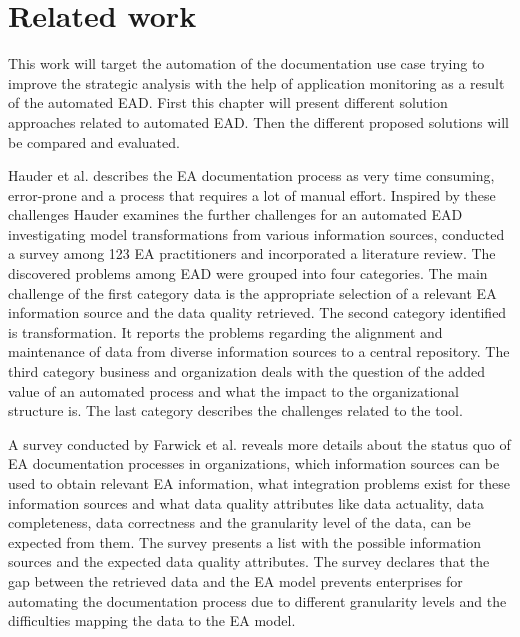\chapter{Related work}\label{chapter:relatedwork}

This work will target the automation of the documentation use case trying to improve the strategic analysis with the help of application monitoring as a result of the automated EAD. First this chapter will present different solution approaches related to automated EAD. Then the different proposed solutions will be compared and evaluated. 

Hauder et al. \cite{Hauder2012} describes the EA documentation process as very time consuming, error-prone and a process that requires a lot of manual effort. Inspired by these challenges Hauder examines the further challenges for an automated EAD investigating model transformations from various information sources, conducted a survey among 123 EA practitioners and incorporated a literature review. The discovered problems among EAD were grouped into four categories. The main challenge of the first category data is the appropriate selection of a relevant EA information source and the data quality retrieved. The second category identified is transformation. It reports the problems regarding the alignment and maintenance of data from diverse information sources to a central repository. The third category business and organization deals with the question of the added value of an automated process and what the impact to the organizational structure is. The last category describes the challenges related to the tool. 

A survey conducted by Farwick et al. \cite{Farwick2013} reveals more details about the  status quo of EA documentation processes in organizations, which information sources can be used to obtain relevant EA information, what integration problems exist for these information sources and what data quality attributes like data actuality,  data completeness, data correctness and the granularity level of the data, can be expected from them. The survey presents a list with the possible information sources and the expected data quality attributes. The survey declares that the gap between the retrieved data and the EA model prevents enterprises for automating the documentation process due to different granularity levels and the difficulties mapping the data to the EA model.

